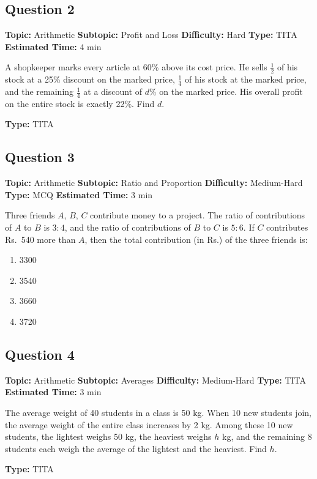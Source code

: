 \documentclass[11pt]{article}
\begin{document}
\subsection*{Question 2}
\textbf{Topic:} Arithmetic \quad \textbf{Subtopic:} Profit and Loss \quad \textbf{Difficulty:} Hard \quad \textbf{Type:} TITA \quad \textbf{Estimated Time:} 4 min

\begin{tcolorbox}
A shopkeeper marks every article at 60\% above its cost price. He sells $\tfrac{1}{2}$ of his stock at a 25\% discount on the marked price, $\tfrac{1}{4}$ of his stock at the marked price, and the remaining $\tfrac{1}{4}$ at a discount of $d\%$ on the marked price. His overall profit on the entire stock is exactly 22\%. Find $d$.
\end{tcolorbox}
\textbf{Type:} TITA

\subsection*{Question 3}
\textbf{Topic:} Arithmetic \quad \textbf{Subtopic:} Ratio and Proportion \quad \textbf{Difficulty:} Medium-Hard \quad \textbf{Type:} MCQ \quad \textbf{Estimated Time:} 3 min

\begin{tcolorbox}
Three friends $A$, $B$, $C$ contribute money to a project. The ratio of contributions of $A$ to $B$ is $3:4$, and the ratio of contributions of $B$ to $C$ is $5:6$. If $C$ contributes Rs.\ 540 more than $A$, then the total contribution (in Rs.) of the three friends is:
\end{tcolorbox}
\begin{enumerate}[label=(\Alph*)]
\item 3300
\item 3540
\item 3660
\item 3720
\end{enumerate}

\subsection*{Question 4}
\textbf{Topic:} Arithmetic \quad \textbf{Subtopic:} Averages \quad \textbf{Difficulty:} Medium-Hard \quad \textbf{Type:} TITA \quad \textbf{Estimated Time:} 3 min

\begin{tcolorbox}
The average weight of 40 students in a class is 50 kg. When 10 new students join, the average weight of the entire class increases by 2 kg. Among these 10 new students, the lightest weighs 50 kg, the heaviest weighs $h$ kg, and the remaining 8 students each weigh the average of the lightest and the heaviest. Find $h$.
\end{tcolorbox}
\textbf{Type:} TITA
\end{document}
